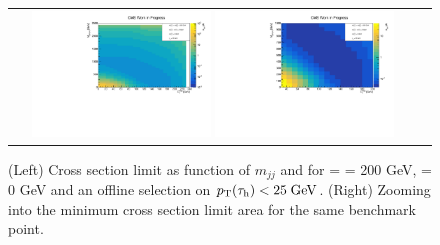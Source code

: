\begin{figure}[tbh!]
	\centering
	\begin{tabular}{cc}
		\includegraphics[width=0.45\textwidth]{analysis/pics/JetInvMass_vs_MET_xsec_chi200_lsp000_taupt25.pdf}
		\includegraphics[width=0.45\textwidth]{analysis/pics/JetInvMass_vs_MET_xsec_chi200_lsp000_taupt25_zoom.pdf} 		
	\end{tabular}
	\caption{(Left) Cross section limit as function of $m_{jj}$ and \met for \charginopm = \neutralinotwo = 200 GeV, \neutralinoone = 0 GeV and an offline selection on $p_{\text{T}}(\tau_{\text{h}}) <  25\;\text{Ge}\kern-0.06667em\text{V}$. (Right) Zooming into the minimum cross section limit area for the same benchmark point.}
	\label{fig::JetInvMass_vs_MET_xsec_chi200_lsp000_taupt25}
\end{figure}

